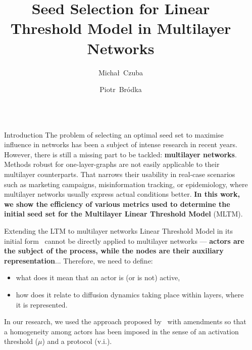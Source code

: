\documentclass[final]{beamer}
\title{Seed Selection for Linear Threshold Model in Multilayer Networks}
\author[Czuba, Bródka]{Michał~Czuba\inst{1} \and Piotr~Bródka\inst{1}}
\institute[WUST]{
    \inst{1}%
    Dept of Artificial Intelligence, Wrocław University of Science and Technology (Lower Silesia, Poland)
}
\newlength{\sepwidth}
\newlength{\colwidth}
\newcommand{\separatorcolumn}{\begin{column}{\sepwidth}\end{column}}
\begin{document}
\begin{frame}[t]
\begin{columns}[t]

\separatorcolumn
\begin{column}{\colwidth}

\begin{block}{Introduction}
    The problem of selecting an optimal seed set to maximise influence in networks has been a subject of intense research in recent years. However, there is still a missing part to be tackled: \textbf{multilayer networks}. Methods robust for one-layer-graphs are not easily applicable to their multilayer counterparts. That narrows their usability in real-case scenarios such as marketing campaigns, misinformation tracking, or epidemiology, where multilayer networks usually express actual conditions better. \textbf{In this work, we show the efficiency of various metrics used to determine the initial seed set for the Multilayer Linear Threshold Model} (MLTM).
\end{block}

\begin{alertblock}{Extending the LTM to multilayer networks}
    Linear Threshold Model in its initial form~\cite{kempe2003maximizing} cannot be directly applied to multilayer networks --- \textbf{actors are the subject of the process, while the nodes are their auxiliary representation}...
    Therefore, we need to define:
    \begin{itemize}
        \item what does it mean that an actor is (or is not) active,
        \item how does it relate to diffusion dynamics taking place within 
        layers, where it is represented.
    \end{itemize}
    In our research, we used the approach proposed by~\cite{zhong2022mltm} with amendments so that a homogeneity among actors has been imposed in the sense of an activation threshold ($\mu$) and a protocol (v.i.).


\end{alertblock}
\end{column}
\end{columns}
\end{frame}
\end{document}
